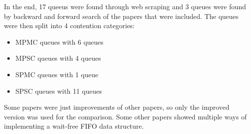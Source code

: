In the end, 17 queeus were found through web scraping and 3 queues were found by backward and forward search of the papers that were included. The queues were then split into 4 contention categories:
\begin{itemize}
   \item \ac{MPMC} queues with 6 queues \cite{Kogan2011WaitFreeQueues,FeldmanDechevV2,RamalheteQueue,Verma2013Scalable,FastFetchAndAddWaitFreeQueue,wCQWaitFreeQueue}
   \item \ac{MPSC} queues with 4 queues \cite{WangCacheCoherent,jiffy,JayantiLog,Drescher2015GuardedSections}
   \item \ac{SPMC} queues with 1 queue \cite{Mateíspmc}
   \item \ac{SPSC} queues with 11 queues \cite{Lamport1983SPSCCircularBuffer,torquati2010singleproducersingleconsumerqueuessharedcache,Wang2013BQueue,MaffioneCacheAware,ffq,JayantiLog}
\end{itemize}
Some papers were just improvements of other papers, so only the improved version was used for the comparison. Some other papers showed multiple ways of implementing a wait-free \ac{FIFO} data structure.